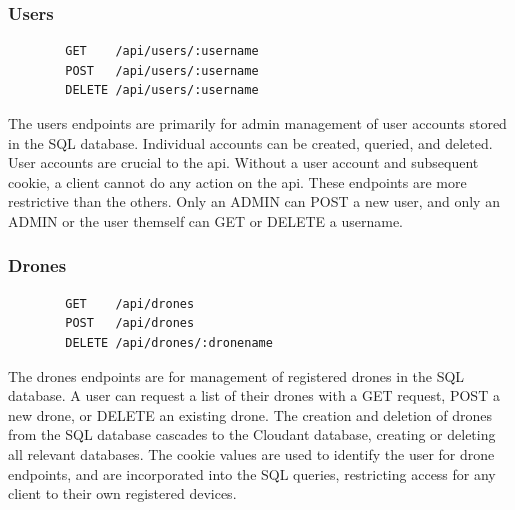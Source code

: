 \documentclass{article}
\begin{document}
\subsubsection{Users}
\begin{center}
	\begin{lstlisting}
		GET    /api/users/:username
		POST   /api/users/:username
		DELETE /api/users/:username
	\end{lstlisting}
\end{center}
The users endpoints are primarily for admin management of user accounts stored in the SQL database. Individual accounts can be created, queried, and deleted. User accounts are crucial to the api. Without a user account and subsequent cookie, a client cannot do any action on the api. These endpoints are more restrictive than the others. Only an ADMIN can POST a new user, and only an ADMIN or the user themself can GET or DELETE a username. 

\subsubsection{Drones}
\begin{center}
	\begin{lstlisting}
		GET    /api/drones
		POST   /api/drones
		DELETE /api/drones/:dronename
	\end{lstlisting}
\end{center}
The drones endpoints are for management of registered drones in the SQL database. A user can request a list of their drones with a GET request, POST a new drone, or DELETE an existing drone. The creation and deletion of drones from the SQL database cascades to the Cloudant database, creating or deleting all relevant databases. The cookie values are used to identify the user for drone endpoints, and are incorporated into the SQL queries, restricting access for any client to their own registered devices. 
\end{document}
